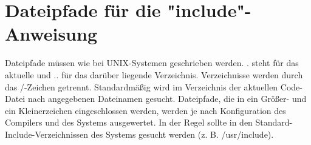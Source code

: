 \section{Dateipfade für die "include"-Anweisung}
Dateipfade müssen wie bei UNIX-Systemen geschrieben werden. . steht für das aktuelle und ..
für das darüber liegende Verzeichnis. Verzeichnisse werden durch das /-Zeichen getrennt.
Standardmäßig wird im Verzeichnis der aktuellen Code-Datei nach angegebenen Dateinamen gesucht.
Dateipfade, die in ein Größer- und ein Kleinerzeichen eingeschlossen werden, werden je nach Konfiguration
des Compilers und des Systems ausgewertet. In der Regel sollte in den Standard-Include-Verzeichnissen
des Systems gesucht werden (z. B. /usr/include).